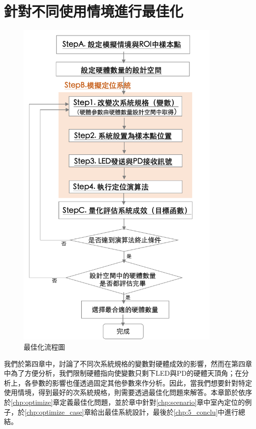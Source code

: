 \chapter{針對不同使用情境進行最佳化}
\label{chp:5}

\begin{figure}[htpb]
    \centering
    \includegraphics[width=10cm]{ch5pic/optimize_flow.png}
    \caption{最佳化流程圖}
    \label{pic:optimize_flow}
\end{figure}

我們於第四章中，討論了不同次系統規格的變數對硬體成效的影響，然而在第四章中為了方便分析，我們限制硬體指向使變數只剩下LED與PD的硬體天頂角；在分析上，各參數的影響也僅透過固定其他參數來作分析。因此，當我們想要針對特定使用情境，得到最好的次系統規格，則需要透過最佳化問題來解答。本章節於依序於\ref{chp:optimize}章定義最佳化問題，並於章中針對\ref{chp:scenario}章中室內定位的例子，於\ref{chp:optimize_case}章給出最佳系統設計，最後於\ref{chp:5_conclu}中進行總結。




